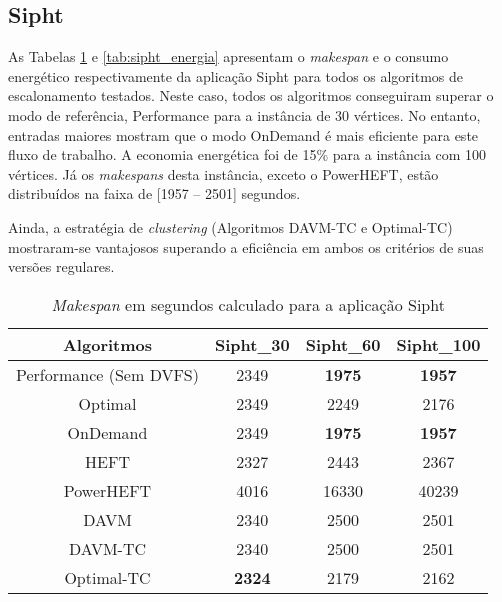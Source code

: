 \subsection{Sipht}
\label{sec:sipht}

As Tabelas \ref{tab:sipht_tempo} e \ref{tab:sipht_energia} apresentam o
\emph{makespan} e o consumo energético respectivamente da aplicação Sipht para
todos os algoritmos de escalonamento testados. Neste caso, todos os algoritmos
conseguiram superar o modo de referência, Performance para a instância de 30
vértices. No entanto, entradas maiores mostram que o modo OnDemand é mais
eficiente para este fluxo de trabalho. A economia energética foi de 15\% para a
instância com 100 vértices. Já os \emph{makespans} desta instância, exceto o
PowerHEFT, estão distribuídos na faixa de [1957 -- 2501] segundos.

Ainda, a estratégia de \emph{clustering} (Algoritmos DAVM-TC e Optimal-TC)
mostraram-se vantajosos superando a eficiência em ambos os critérios de suas
versões regulares.

\begin{table}
	\centering
    \begin{tabular}{c|ccc}
    \hline
    \textbf{Algoritmos}   & \textbf{Sipht\_30} & \textbf{Sipht\_60} & \textbf{Sipht\_100} \\ \hline
    Performance (Sem DVFS)                              & 2349     & \textbf{1975}     & \textbf{1957}      \\
    \cite{guerout:energy_aware_simulation} Optimal      & 2349     & 2249     & 2176      \\
    \cite{guerout:energy_aware_simulation} OnDemand     & 2349     & \textbf{1975}     & \textbf{1957}      \\
    HEFT                                                & 2327     & 2443     & 2367      \\
    PowerHEFT                                           & 4016     & 16330    & 40239     \\
    DAVM                                                & 2340     & 2500     & 2501      \\
    DAVM-TC                                             & 2340     & 2500     & 2501      \\
    Optimal-TC                                          & \textbf{2324}     & 2179     & 2162      \\ \hline
    \end{tabular}
    \caption{\emph{Makespan} em segundos calculado para a aplicação Sipht}
    \label{tab:sipht_tempo}
\end{table}



